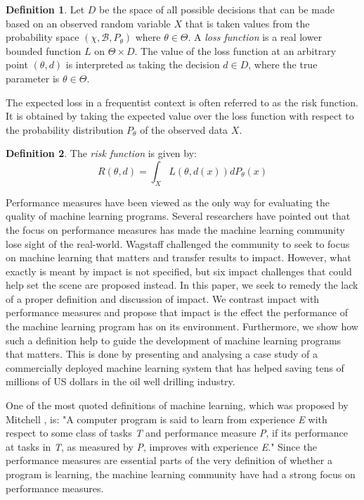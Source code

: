 \documentclass{article}
\theoremstyle{theorem}
\theoremstyle{definition}
\newtheorem{definition}{Definition}
\begin{document}
\begin{definition}
Let $D$ be the space of all possible decisions that can be made based on an observed random variable $X$ that is taken values from the probability space $(\chi, \mathcal{B}, P_\theta)$ where $\theta \in \Theta$.  A \emph{loss function} is a real lower bounded function $L$ on $\Theta \times D$.  The value of the loss function at an arbitrary point $(\theta, d)$ is interpreted as taking the decision $d \in D$, where the true parameter is $\theta \in \Theta$.
\end{definition}

The expected loss in a frequentist context is often referred to as the risk function.  It is obtained by taking the expected value over the loss function with respect to the probability distribution $P_\theta$ of the observed data $X$.


\begin{definition}
The \emph{risk function} is given by:
\begin{equation}
R(\theta,d) = \int_{X} L(\theta, d(x)) dP_\theta(x)
\end{equation}
\end{definition}




Performance measures have been viewed as the only way for evaluating the quality of machine learning programs.
Several researchers have pointed out that the focus on performance measures has made the machine learning community lose sight of the real-world.
Wagstaff  \cite{Wagstaff_2012} challenged the community to seek to focus on machine learning that matters and transfer results to impact.
However, what exactly is meant by impact is not specified, but six impact challenges that could help set the scene are proposed instead.
In this paper, we seek to remedy the lack of a proper definition and discussion of impact.
We contrast impact with performance measures and propose that impact is the effect the performance of the machine learning program has on its environment.
Furthermore, we show how such a definition help to guide the development of machine learning programs that matters.
This is done by presenting and analysing a case study of a commercially deployed machine learning system that has helped saving tens of millions of US dollars in the oil well drilling industry.


One of the most quoted definitions of machine learning, which was proposed by Mitchell \cite{Mitchell_1997}, is: "A computer program is said to learn from experience \emph{E} with respect to some class of tasks \emph{T} and performance measure \emph{P}, if its performance at tasks in \emph{T}, as measured by \emph{P}, improves with experience \emph{E}." 
Since the performance measures are essential parts of the very definition of whether a program is learning, the machine learning community have had a strong focus on performance measures. 
\end{document}
